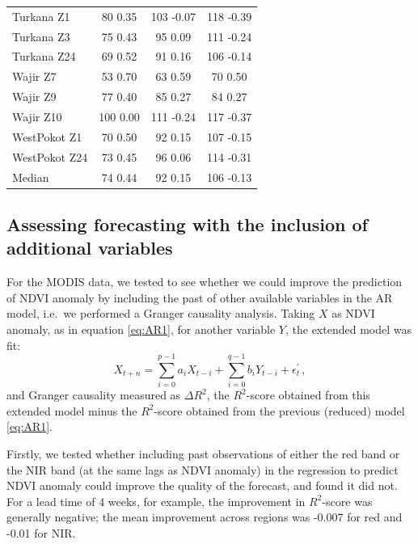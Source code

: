 \documentclass[review]{elsarticle}
\begin{document}
\begin{table}
\begin{tabular}{l|ccc}
		Turkana Z1 	& 	80 	0.35 	& 	103 	-0.07 	& 	118 	-0.39\\
		Turkana Z3 	& 	75 	0.43 	& 	95 	0.09 	& 	111 	-0.24\\
		Turkana Z24 	& 	69 	0.52 	& 	91 	0.16 	& 	106 	-0.14\\
		Wajir Z7 	& 	53 	0.70 	& 	63 	0.59 	& 	70 	0.50\\
		Wajir Z9 	& 	77 	0.40 	& 	85 	0.27 	& 	84 	0.27\\
		Wajir Z10 	& 	100 	0.00 	& 	111 	-0.24 	& 	117 	-0.37\\
		WestPokot Z1 	& 	70 	0.50 	& 	92 	0.15 	& 	107 	-0.15\\
		WestPokot Z24 	& 	73 	0.45 	& 	96 	0.06 	& 	114 	-0.31\\
		\bottomrule
		Median & 74 0.44 & 92 0.15 & 106 -0.13 \\
		\bottomrule
	\end{tabular}
\end{table}
\newpage

\subsection{Assessing forecasting with the inclusion of additional variables} 

For the MODIS data, we tested to see whether we could improve the prediction of NDVI anomaly by including the past of other available variables in the AR model, i.e.~we performed a Granger causality analysis. Taking $X$ as NDVI anomaly, as in equation \eqref{eq:AR1}, for another variable $Y$, the extended model was fit:
\begin{equation}
X_{t+n}=\sum_{i=0}^{p-1}a_iX_{t-i}+\sum_{i=0}^{q-1}b_iY_{t-i}+\epsilon^{\prime}_t\,,
\end{equation}
and Granger causality measured as $\Delta R^2$, the $R^2$-score obtained from this extended model minus the $R^2$-score obtained  from the previous (reduced) model \eqref{eq:AR1}. 

Firstly, we tested whether including past observations of either the red band or the NIR band (at the same lags as NDVI anomaly) in the regression to predict NDVI anomaly could improve the quality of the forecast, and found it did not. For a lead time of 4 weeks, for example, the improvement in $R^2$-score was generally negative; the mean improvement across regions was -0.007 for red and -0.01 for NIR.
\end{document}
